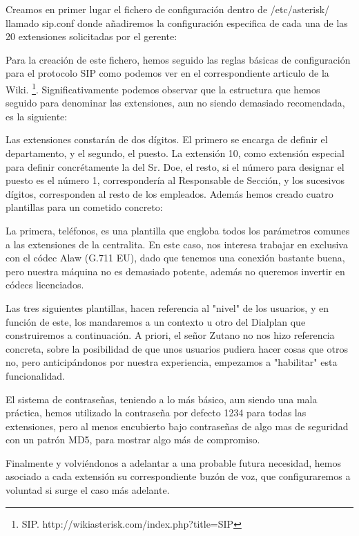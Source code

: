 Creamos en primer lugar el fichero de configuración dentro de /etc/asterisk/ llamado sip.conf donde añadiremos la configuración especifica de cada una de las 20 extensiones solicitadas por el gerente:



Para la creación de este fichero, hemos seguido las reglas básicas de configuración para el protocolo SIP como podemos ver en el correspondiente articulo de la Wiki. \footnote{SIP. http://wikiasterisk.com/index.php?title=SIP}. Significativamente podemos observar que la estructura que hemos seguido para denominar las extensiones, aun no siendo demasiado recomendada, es la siguiente:

Las extensiones constarán de dos dígitos. El primero se encarga de definir el departamento, y el segundo, el puesto. La extensión 10, como extensión especial para definir concrétamente la del Sr. Doe, el resto, si el número para designar el puesto es el número 1, correspondería al Responsable de Sección, y los sucesivos dígitos, corresponden al resto de los empleados. Además hemos creado cuatro plantillas para un cometido concreto: 

La primera, teléfonos, es una plantilla que engloba todos los parámetros comunes a las extensiones de la centralita. En este caso, nos interesa trabajar en exclusiva con el códec Alaw (G.711 EU), dado que tenemos una conexión bastante buena, pero nuestra máquina no es demasiado potente, además no queremos invertir en códecs licenciados.

Las tres siguientes plantillas, hacen referencia al "nivel" de los usuarios, y en función de este, los mandaremos a un contexto u otro del Dialplan que construiremos a continuación. A priori, el señor Zutano no nos hizo referencia concreta, sobre la posibilidad de que unos usuarios pudiera hacer cosas que otros no, pero anticipándonos por nuestra experiencia, empezamos a "habilitar" esta funcionalidad.

El sistema de contraseñas, teniendo a lo más básico, aun siendo una mala práctica, hemos utilizado la contraseña por defecto 1234 para todas las extensiones, pero al menos encubierto bajo contraseñas de algo mas de seguridad con un patrón MD5, para mostrar algo más de compromiso.

Finalmente y volviéndonos a adelantar a una probable futura necesidad, hemos asociado a cada extensión su correspondiente buzón de voz, que configuraremos a voluntad si surge el caso más adelante.

